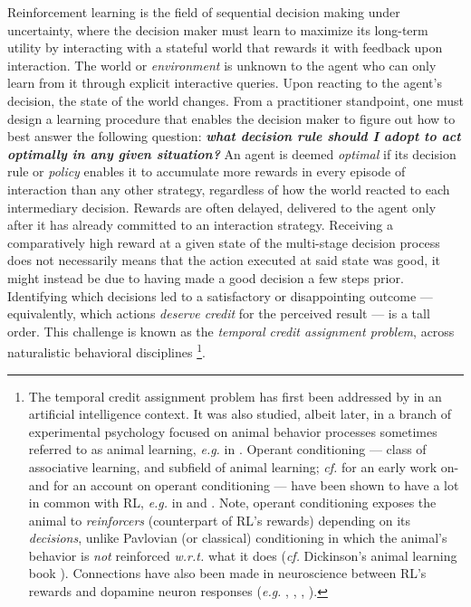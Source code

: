 Reinforcement learning is the field of
sequential decision making under uncertainty,
where the decision maker must learn to maximize its long-term utility
by interacting with a stateful world that rewards it with feedback upon interaction.
The world or \emph{environment} is unknown to the agent who can only learn from it through explicit
interactive queries.
Upon reacting to the agent's decision, the state of the world changes.
From a practitioner standpoint, one must design a learning procedure
that enables the decision maker to figure out how to best answer the following question:
\textbf{\emph{what decision rule should I adopt to act \emph{optimally} in any given situation?}}
An agent is deemed \emph{optimal} if its decision rule or \emph{policy} enables it to
accumulate more rewards in every episode of interaction
than any other strategy,
regardless of how the world reacted to each intermediary decision.
Rewards are often delayed, delivered to the agent only after it has already committed
to an interaction strategy.
Receiving a comparatively high reward at a given state of the multi-stage decision process does not
necessarily means that the action executed at said state was good,
it might instead be due to having made a good decision a few steps prior.
Identifying which decisions led to a satisfactory or disappointing outcome
--- equivalently, which actions \emph{deserve credit} for the perceived result --- is a tall order.
This challenge is known as the \emph{temporal credit assignment problem},
across naturalistic behavioral disciplines
\footnote{
The temporal credit assignment problem has first been addressed by \cite{Minsky1961-qb}
in an artificial intelligence context.
It was also studied, albeit later,
in a branch of experimental psychology focused on animal behavior processes sometimes
referred to as animal learning, \textit{e.g.} in \cite{Mackintosh1975-yg}.
Operant conditioning --- class of associative learning, and subfield of animal learning;
\textit{cf.} \cite{Skinner1948-nh} for an early work on- and \cite{Mackintosh1983-kd} for an account on
operant conditioning
---
have been shown to have a lot in common with RL,
\textit{e.g.} in \cite{Schmajuk1997-hq} and \cite{Touretzky1997-tm}.
Note, operant conditioning exposes the animal to \textit{reinforcers} (counterpart of RL's rewards)
depending on its \emph{decisions}, unlike Pavlovian (or classical) conditioning in which the animal's
behavior is \emph{not} reinforced \textit{w.r.t.} what it does
(\textit{cf.} Dickinson's animal learning book \cite{Dickinson1980-oq}).
Connections have also been made in neuroscience between RL's rewards and
dopamine neuron responses
(\textit{e.g.} \cite{Ljungberg1992-fr}, \cite{Montague1996-iy}, \cite{Schultz1997-xx}, \cite{Dabney2020-nm}).
}.

